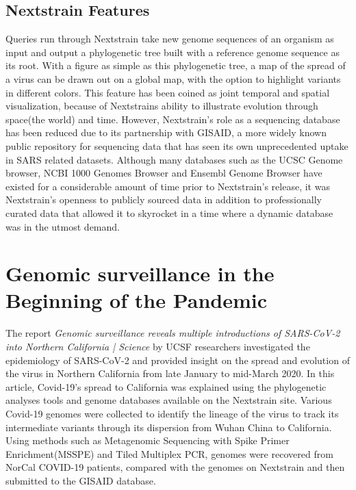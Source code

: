 \documentclass[12pt,journal,compsoc]{IEEEtran}
\begin{document}
\subsection*{Nextstrain Features}
Queries run through Nextstrain take new genome sequences of an organism as input and output a phylogenetic tree built with a reference genome sequence as its root. With a figure as simple as this phylogenetic tree, a map of the spread of a virus can be drawn out on a global map, with the option to highlight variants in different colors. This feature has been coined as joint temporal and spatial visualization, because of Nextstrains ability to illustrate evolution through space(the world) and time. However, Nextstrain's role as a sequencing database has been reduced due to its partnership with GISAID, a more widely known public repository for sequencing data that has seen its own unprecedented uptake in SARS related datasets. Although many databases such as the UCSC Genome browser, NCBI 1000 Genomes Browser and Ensembl Genome Browser have existed for a considerable amount of time prior to Nextstrain's release, it was Nextstrain's openness to publicly sourced data in addition to professionally curated data that allowed it to skyrocket in a time where a dynamic database was in the utmost demand.


\section{Genomic surveillance in the Beginning of the Pandemic}
The report \emph{Genomic surveillance reveals multiple introductions of SARS-CoV-2 into Northern California | Science}\cite{nc:ucsf}  by UCSF researchers investigated the  epidemiology of SARS-CoV-2 and provided insight on the spread and evolution of the virus in Northern California from late January to mid-March 2020. In this article, Covid-19’s spread to California was explained using the phylogenetic analyses tools and genome databases available on the Nextstrain site. Various Covid-19 genomes were collected to identify the lineage of the virus to track its intermediate variants through its dispersion from Wuhan China to California. Using methods such as Metagenomic Sequencing with Spike Primer Enrichment(MSSPE) and Tiled Multiplex PCR, genomes were recovered from NorCal COVID-19 patients, compared with the genomes on Nextstrain and then submitted to the GISAID database. 
\end{document}
